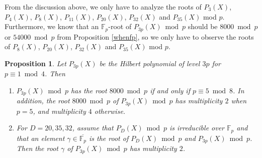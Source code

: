 \documentclass[a4paper, 11pt]{article}
\theoremstyle{plain}
\newtheorem{prop}[defn]{Proposition}
\newcommand{\?}{\textcolor{red}{??}}
\newcommand{\fp}{\mathbb{F}_p}
\begin{document}
From the discussion above, we only have to analyze the roots of $P_3(X)$, $P_{4}(X)$, $P_8(X)$, $P_{11}(X)$, $P_{20}(X)$, $P_{32}(X)$ and $P_{35}(X)$ mod $p$. Furthermore, we know that an $\fp$-root of $P_{3p}(X) \bmod p$ should be $8000\bmod p$ or $54000\bmod p$ from Proposition \ref{whenfp}, so we only have to observe the roots of  $P_8(X)$, $P_{20}(X)$, $P_{32}(X)$ and $P_{35}(X) $ mod $p$. 

\begin{prop}
\label{multiplicity}
    Let $P_{3p}(X)$ be the Hilbert polynomial of level $3p$ for $p \equiv1 \bmod 4$. Then
    \begin{enumerate}
        \item [\rm{(a)}] $P_{3p}(X) \bmod p$ has the root $8000 \bmod p $ if and only if $p \equiv5 \bmod 8$. In addition, the root $8000 \bmod p$ of $P_{3p}(X) \bmod p$ has multiplicity $2$ when $p=5$, and multiplicity $4$ otherwise.
\item[\rm{(b)}] For $D=20,35,32$, assume that $P_{D}(X) \bmod p$ is irreducible over $\fp$ and that an element $\gamma\in \overline{\fp}$ is the root of $P_{D}(X) \bmod p$ and $P_{3p}(X) \bmod p$.  Then the root $\gamma$ of $P_{3p}(X) \bmod p$ has multiplicity $2$.
    \end{enumerate}
\end{prop}
\end{document}

